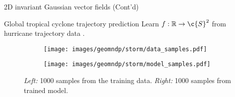 \begin{frame}{2D invariant Gaussian vector fields (Cont'd)}
\begin{figure}
            \label{fig:ablation_training_samples}
        \label{fig:vec_gp_results}
        \end{figure}
        
    
\end{frame}

\begin{frame}{Global tropical cyclone trajectory prediction}
     Learn \(f: \R \to \c{S}^2\) from hurricane trajectory data \cite{IBTrACSv4data}.
    

        
    \begin{figure}
        \centering
        \begin{subfigure}{0.49\textwidth}
            \texttt{[image: images/geomndp/storm/data\_samples.pdf]}
        \end{subfigure}
        \hfill
        \begin{subfigure}{0.49\textwidth}
            \texttt{[image: images/geomndp/storm/model\_samples.pdf]}
        \end{subfigure}
        \caption{\emph{Left:} 1000 samples from the training data. \emph{Right:} 1000 samples from trained model.}
        \label{fig:cyclone_comparison}
    \end{figure}    
\end{frame}

